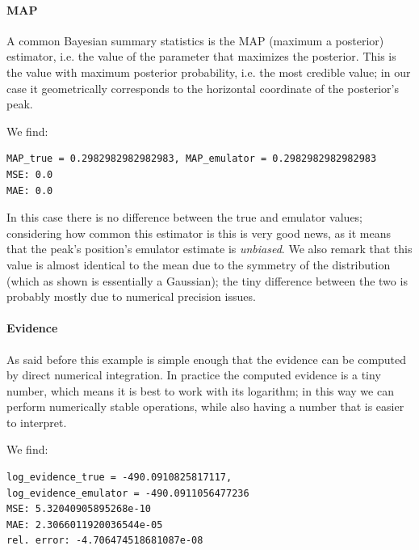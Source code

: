 \paragraph{MAP}
A common Bayesian summary statistics is the MAP (maximum a posterior) estimator, i.e. the value of the parameter that maximizes the posterior. This is the value with maximum posterior probability, i.e. the most credible value; in our case it geometrically corresponds to the horizontal coordinate of the posterior's peak.

We find:
\begin{verbatim}
MAP_true = 0.2982982982982983, MAP_emulator = 0.2982982982982983
MSE: 0.0
MAE: 0.0
\end{verbatim}
In this case there is no difference between the true and emulator values; considering how common this estimator is this is very good news, as it means that the peak's position's emulator estimate is \emph{unbiased}.
We also remark that this value is almost identical to the mean due to the symmetry of the distribution (which as shown is essentially a Gaussian); the tiny difference between the two is probably mostly due to numerical precision issues.

\paragraph{Evidence}
As said before this example is simple enough that the evidence can be computed by direct numerical integration. In practice the computed evidence is a tiny number, which means it is best to work with its logarithm; in this way we can perform numerically stable operations, while also having a number that is easier to interpret.

We find:
\begin{verbatim}
log_evidence_true = -490.0910825817117, 
log_evidence_emulator = -490.0911056477236
MSE: 5.32040905895268e-10
MAE: 2.3066011920036544e-05
rel. error: -4.706474518681087e-08
\end{verbatim}


